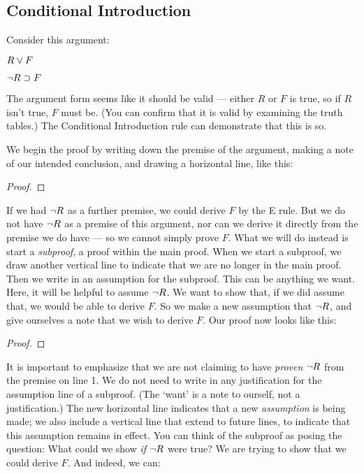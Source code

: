 \subsection{Conditional Introduction}

Consider this argument:
\begin{earg}
\item[] $R \vee F$
\item[\therefore] $\neg R \supset F$
\end{earg}
The argument form seems like it should be valid --- either $R$ or $F$ is true, so if $R$ isn't true, $F$ must be. (You can confirm that it is valid by examining the truth tables.) The Conditional Introduction rule can demonstrate that this is so.

We begin the proof by writing down the premise of the argument, making a note of our intended conclusion, and drawing a horizontal line, like this:

\begin{proof}
	 
\end{proof}

If we had $\neg R$ as a further premise, we could derive $F$ by the {\eor}E rule. But we do not have $\neg R$ as a premise of this argument, nor can we derive it directly from the premise we do have --- so we cannot simply prove $F$. What we will do instead is start a \emph{subproof}, a proof within the main proof. When we start a subproof, we draw another vertical line to indicate that we are no longer in the main proof. Then we write in an assumption for the subproof. This can be anything we want. Here, it will be helpful to assume $\neg R$. We want to show that, if we did assume that, we would be able to derive $F$. So we make a new assumption that $\neg R$, and give ourselves a note that we wish to derive $F$. Our proof now looks like this:

\begin{proof}
	  
	\open
		 
		\have{}{}
	\close
\end{proof}

It is important to emphasize that we are not claiming to have \emph{proven} $\neg R$ from the premise on line 1. We do not need to write in any justification for the assumption line of a subproof. (The `want' is a note to ourself, not a justification.) The new horizontal line indicates that a new \emph{assumption} is being made; we also include a vertical line that extend to future lines, to indicate that this assumption remains in effect. You can think of the subproof as posing the question: What could we show \emph{if} $\neg R$ were true? We are trying to show that we could derive $F$. And indeed, we can:

